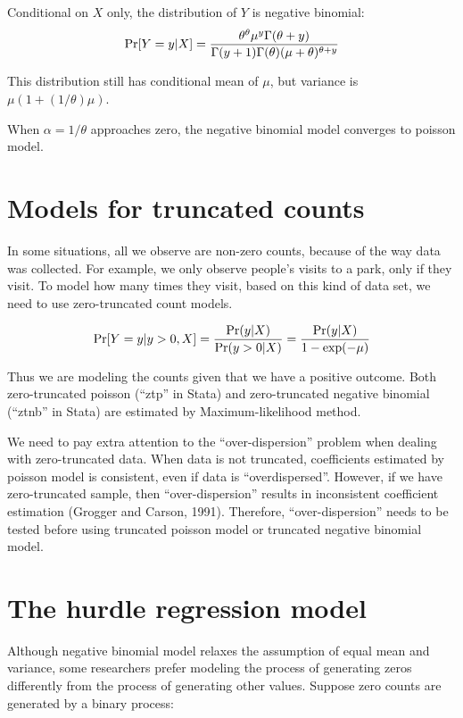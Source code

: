 Conditional on $X$ only, the distribution of $Y$ is negative binomial:
\begin{equation}
{\rm Pr} [Y=y | X]=\frac{\theta^{\theta} \mu^y \Gamma(\theta + y)}{
  \Gamma(y+1) \Gamma(\theta) (\mu + \theta)^{\theta+y}}
\end{equation}

This distribution still has conditional mean of $\mu$, but variance is
$\mu (1+(1/\theta) \mu)$.  

When $\alpha=1/\theta$ approaches zero, the negative binomial model
converges to poisson model.  

\section{Models for truncated counts}

In some situations, all we observe are non-zero counts, because of the
way data was collected.  For example, we only observe people's visits
to a park, only if they visit.  To model how many times they visit,
based on this kind of data set, we need to use zero-truncated count
models.  

\begin{equation}
{\rm Pr} [Y=y | y>0, X]=\frac{{\rm Pr} (y | X) }{{\rm Pr} (y>0 | X)}=
\frac{{\rm Pr} (y | X)}{1- \exp (- \mu)} \label{hurdle}
\end{equation}

Thus we are modeling the counts given that we have a positive
outcome.  Both zero-truncated poisson (``ztp'' in Stata) and
zero-truncated negative binomial (``ztnb'' in Stata) are estimated by
Maximum-likelihood method.  

We need to pay extra attention to the ``over-dispersion'' problem when
dealing with zero-truncated data.  When data is not truncated,
coefficients estimated by poisson model is consistent, even if data is
``overdispersed''.  However, if we have zero-truncated sample, then
``over-dispersion'' results in inconsistent coefficient estimation
(Grogger and Carson, 1991).  Therefore, ``over-dispersion'' needs to be
tested before using truncated poisson model or truncated negative
binomial model.  

\section{The hurdle regression model}

Although negative binomial model relaxes the assumption of equal mean
and variance, some researchers prefer modeling the process of
generating zeros differently from the process of generating other
values.  Suppose zero counts are generated by a binary process:


